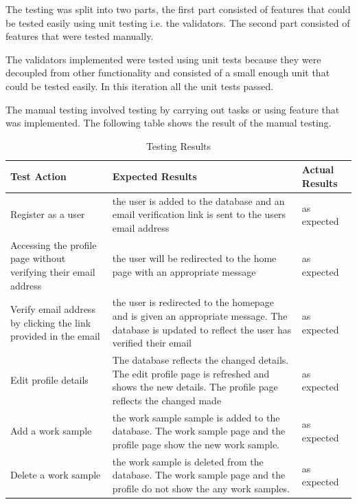 \documentclass[a4paper,oneside,11pt]{report}
\begin{document}
The testing was split into two parts, the first part consisted of features that could be tested easily using unit testing i.e. the validators. The second part consisted of features that were tested manually.

The validators implemented were tested using unit tests because they were decoupled from other functionality and consisted of a small enough unit that could be tested easily. In this iteration all the unit tests passed.

The manual testing involved testing by carrying out tasks or using feature that was implemented.
The following table shows the result of the manual testing.

\begin{center}
	\begin{table}[!ht]
    \begin{tabular}[ht]{| p{5cm} | p{5cm} | l |}
    \hline
    Test Action & Expected Results & Actual Results \\ 
    \hline
    Register as a user & the user is added to the database and an email verification link is sent to the users email address & as expected \\
    \hline
    Accessing the profile page without verifying their email address & the user will be redirected to the home page with an appropriate message & as expected \\
    \hline
    Verify email address by clicking the link provided in the email & the user is redirected to the homepage and is given an appropriate message. The database is updated to reflect the user has verified their email & as expected \\
    \hline
    Edit profile details & The database reflects the changed details. The edit profile page is refreshed and shows the new details. The profile page reflects the changed made & as expected \\
    \hline
    Add a work sample & the work sample sample is added to the database. The work sample page and the profile page show the new work sample. & as expected \\ 
    \hline
    Delete a work sample & the work sample is deleted from the database. The work sample page and the profile do not show the any work samples. & as expected \\
    \hline
    \end{tabular}
    \caption{Testing Results}
\label{tab:xyz}
    \end{table}
    \end{center}
\end{document}

